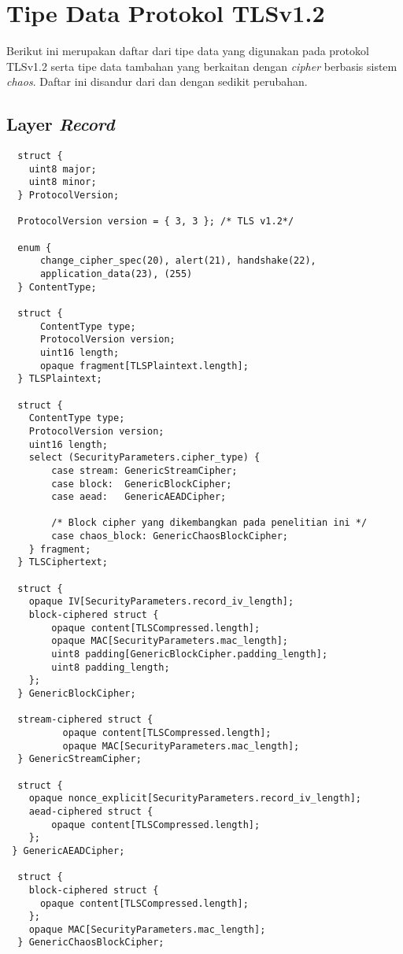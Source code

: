 \chapter{{{Tipe Data Protokol TLSv1.2}}} 
\label{appendix:tls12.datatype}

Berikut ini merupakan daftar dari tipe data yang digunakan pada protokol TLSv1.2 serta tipe data tambahan yang berkaitan dengan \emph{cipher} berbasis sistem \emph{chaos}. Daftar ini disandur dari \textcite{rfc5246} dan \textcite{rfc4492} dengan sedikit perubahan.

\section{Layer \emph{Record}}

\begin{verbatim}
  struct {
    uint8 major;
    uint8 minor;
  } ProtocolVersion;

  ProtocolVersion version = { 3, 3 }; /* TLS v1.2*/

  enum {
      change_cipher_spec(20), alert(21), handshake(22),
      application_data(23), (255)
  } ContentType;

  struct {
      ContentType type;
      ProtocolVersion version;
      uint16 length;
      opaque fragment[TLSPlaintext.length];
  } TLSPlaintext;

  struct {
    ContentType type;
    ProtocolVersion version;
    uint16 length;
    select (SecurityParameters.cipher_type) {
        case stream: GenericStreamCipher;
        case block:  GenericBlockCipher;
        case aead:   GenericAEADCipher;

        /* Block cipher yang dikembangkan pada penelitian ini */
        case chaos_block: GenericChaosBlockCipher;
    } fragment;
  } TLSCiphertext;

  struct {
    opaque IV[SecurityParameters.record_iv_length];
    block-ciphered struct {
        opaque content[TLSCompressed.length];
        opaque MAC[SecurityParameters.mac_length];
        uint8 padding[GenericBlockCipher.padding_length];
        uint8 padding_length;
    };
  } GenericBlockCipher;

  stream-ciphered struct {
          opaque content[TLSCompressed.length];
          opaque MAC[SecurityParameters.mac_length];
  } GenericStreamCipher;
  
  struct {
    opaque nonce_explicit[SecurityParameters.record_iv_length];
    aead-ciphered struct {
        opaque content[TLSCompressed.length];
    };
 } GenericAEADCipher;

  struct {
    block-ciphered struct {
      opaque content[TLSCompressed.length];
    };
    opaque MAC[SecurityParameters.mac_length];
  } GenericChaosBlockCipher;


\end{verbatim}

